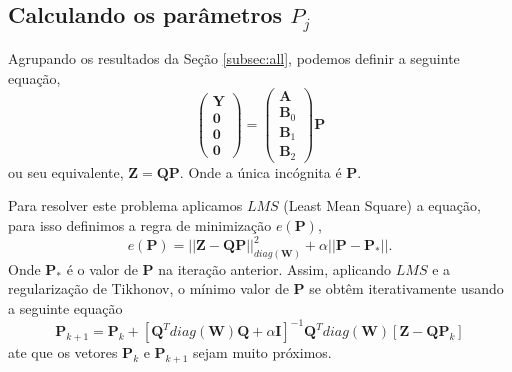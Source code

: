 \documentclass[a4paper,10pt]{article}
\begin{document}
\subsection{Calculando os parâmetros $P_j$}
Agrupando os resultados da  Seção \ref{subsec:all}, 
podemos definir a seguinte equação,
\begin{equation}
\left(\begin{matrix}
\mathbf{Y} \\
\mathbf{0} \\
\mathbf{0} \\
\mathbf{0} 
\end{matrix}\right)
=\left(\begin{matrix}
\mathbf{A} \\
\mathbf{B}_0 \\
\mathbf{B}_1 \\
\mathbf{B}_2 
\end{matrix}\right) \mathbf{P}
\end{equation}
ou seu equivalente, $\mathbf{Z} = \mathbf{Q}  \mathbf{P}$. Onde a única incógnita é $\mathbf{P}$.

Para resolver este problema aplicamos $LMS$ (Least Mean Square) a equação, para isso
definimos a  regra de minimização $e(\mathbf{P})$,
\begin{equation}
 e(\mathbf{P})=||\mathbf{Z} -\mathbf{Q}  \mathbf{P} ||_{diag(\mathbf{W})}^2+\alpha || \mathbf{P}-\mathbf{P}_{*} ||.
\end{equation}
Onde $\mathbf{P}_{*}$ é o valor de $\mathbf{P}$ na iteração anterior. Assim, aplicando
$LMS$ e a regularização de Tikhonov, o mínimo valor de $\mathbf{P}$ se obtêm iterativamente usando a seguinte equação
\begin{equation}
\mathbf{P}_{k+1}= \mathbf{P}_{k}+ \left[ \mathbf{Q}^T diag(\mathbf{W})\mathbf{Q} +\alpha \mathbf{I} \right]^{-1} \mathbf{Q}^T diag(\mathbf{W})  \left[ \mathbf{Z}-\mathbf{Q}  \mathbf{P}_{k} \right]
\end{equation}
ate que os vetores $\mathbf{P}_{k}$ e $\mathbf{P}_{k+1}$ sejam muito próximos.
\end{document}
